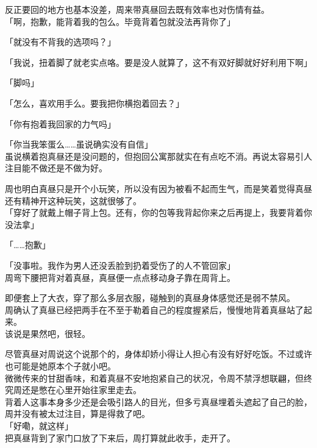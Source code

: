 反正要回的地方也基本没差，周来带真昼回去既有效率也对伤情有益。\\

「啊，抱歉，能背着我的包么。毕竟背着包就没法再背你了」

「就没有不背我的选项吗？」

「我说，扭着脚了就老实点咯。要是没人就算了，这不有双好脚就好好利用下啊」

「脚吗」

「怎么，喜欢用手么。要我把你横抱着回去？」

「你有抱着我回家的力气吗」

「你当我笨蛋么……虽说确实没有自信」\\

虽说横着抱真昼还是没问题的，但抱回公寓那就实在有点吃不消。再说太容易引人注目能不做还是不做为好。

周也明白真昼只是开个小玩笑，所以没有因为被看不起而生气，而是笑着觉得真昼还有精神开这种玩笑，这就很够了。\\

「穿好了就戴上帽子背上包。还有，你的包等我背起你来之后再提上，我要背着你没法拿」

「……抱歉」

「没事啦。我作为男人还没丢脸到扔着受伤了的人不管回家」\\

周弯下腰把背对着真昼，真昼便一点点移动身子靠在周背上。

即便套上了大衣，穿了那么多层衣服，碰触到的真昼身体感觉还是弱不禁风。\\

周确认了真昼已经把两手在不至于勒着自己的程度握紧后，慢慢地背着真昼站了起来。\\

该说是果然吧，很轻。

尽管真昼对周说这个说那个的，身体却娇小得让人担心有没有好好吃饭。不过或许也可能是她原本个子就小吧。\\

微微传来的甘甜香味，和着真昼不安地抱紧自己的状况，令周不禁浮想联翩，但终究周还是憋在心里开始往家里走去。\\

背着人这事本身多少还是会吸引路人的目光，但多亏真昼埋着头遮起了自己的脸，周并没有被太过注目，算是得救了吧。\\

「好嘞，就这样」\\

把真昼背到了家门口放了下来后，周打算就此收手，走开了。

